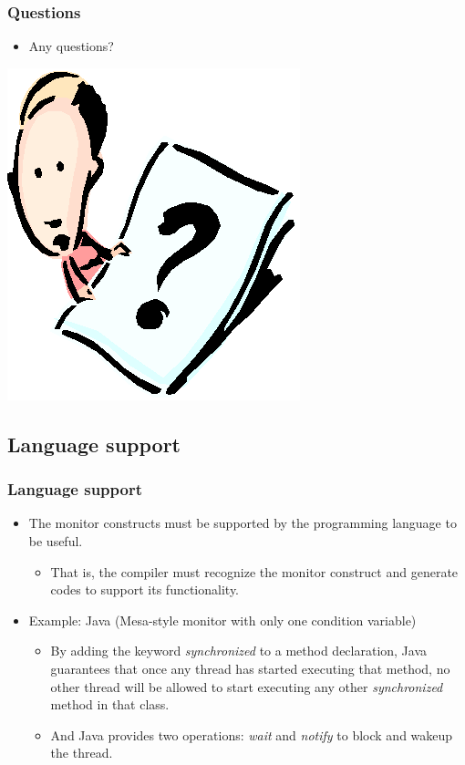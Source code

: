 \documentclass[CJKutf8,xcolor=pdftex,dvipsnames,table]{beamer}
\begin{document}
\begin{CJK*}{UTF8}{song}
  \begin{frame}
  \frametitle{Questions}
  \begin{itemize}
  \item{Any questions?}
  \end{itemize}
  \begin{center}
    \includegraphics[scale=.5]{question}
  \end{center}
  \end{frame}

  \subsection{Language support}

  \begin{frame}
 \frametitle{Language support} \pause
 \begin{itemize}
 \item{The monitor constructs must be supported by the programming language to be useful.} \pause
   \begin{itemize}
   \item{That is, the compiler must recognize the monitor construct and
     generate codes to support its functionality.} \pause
   \end{itemize}
 \item{Example: Java (Mesa-style monitor with only one condition variable)} \pause
     \begin{itemize}
     \item{By adding the keyword \emph{synchronized} to a method declaration,
       Java guarantees that once any thread has started executing that method,
       no other thread will be allowed to start executing any other \emph{synchronized} method in that class.} \pause
     \item{And Java provides two operations: \emph{wait} and \emph{notify} to block and wakeup the thread.}
     \end{itemize}
 \end{itemize}
  \end{frame}


\end{CJK*}
\end{document}
